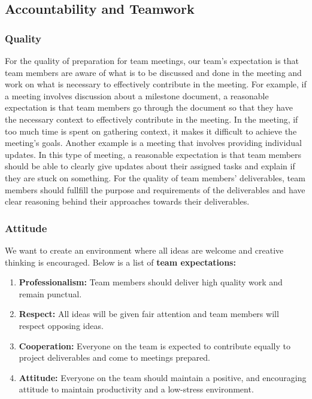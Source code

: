 \documentclass{article}
\begin{document}
\subsection*{Accountability and Teamwork}

\subsubsection*{Quality} 
For the quality of preparation for team meetings, our team's expectation is that team members
are aware of what is to be discussed and done in the meeting and work on what is necessary to effectively contribute
in the meeting. For example, if a meeting involves discussion about a milestone document, a reasonable expectation is that team members
go through the document so that they have the necessary context to effectively contribute
in the meeting. In the meeting, if too much time is spent on gathering context, it makes it
difficult to achieve the meeting's goals. Another example is a meeting that involves providing 
individual updates. In this type of meeting, a reasonable expectation is that team members should be able to
clearly give updates about their assigned tasks and explain if they are stuck on something. For the quality of team members' deliverables,
team members should fullfill the purpose and requirements of the deliverables and have clear reasoning behind
their approaches towards their deliverables.


\subsubsection*{Attitude}

We want to create an environment where all ideas are welcome and creative thinking is encouraged. Below is a list of \textbf{team expectations:}

\begin{enumerate}
    \item \textbf{Professionalism:} Team members should deliver high quality work and remain punctual.
    \item \textbf{Respect:} All ideas will be given fair attention and team members will respect opposing ideas.
    \item \textbf{Cooperation:} Everyone on the team is expected to contribute equally to project deliverables and come to meetings prepared.
    \item \textbf{Attitude:} Everyone on the team should maintain a positive, and encouraging attitude to maintain productivity and a low-stress environment.
\end{enumerate}
\end{document}
